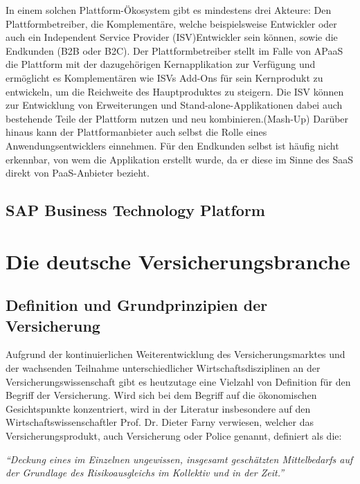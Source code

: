In einem solchen Plattform-Ökosystem gibt es mindestens drei Akteure: Den Plattformbetreiber, die Komplementäre, welche beispielsweise Entwickler oder auch ein Independent Service Provider (ISV)Entwickler sein können, sowie die Endkunden (B2B oder B2C). Der Plattformbetreiber stellt im Falle von APaaS die Plattform mit der dazugehörigen Kernapplikation zur Verfügung und ermöglicht es Komplementären wie ISVs Add-Ons für sein Kernprodukt zu entwickeln, um die Reichweite des Hauptproduktes zu steigern. Die ISV können zur Entwicklung von Erweiterungen und Stand-alone-Applikationen dabei auch bestehende Teile der Plattform nutzen und neu kombinieren.(Mash-Up) Darüber hinaus kann der Plattformanbieter auch selbst die Rolle eines Anwendungsentwicklers einnehmen.\autocite[Vgl.][S. 444f]{FOERDERER2018} Für den Endkunden selbst ist häufig nicht erkennbar, von wem die Applikation erstellt wurde, da er diese im Sinne des SaaS direkt von PaaS-Anbieter bezieht. \autocite[Vgl.][S. 372]{BEIMBORN2011}

\subsection{SAP Business Technology Platform}



\section{Die deutsche Versicherungsbranche}

\subsection{Definition und Grundprinzipien der Versicherung}

Aufgrund der kontinuierlichen Weiterentwicklung des Versicherungsmarktes und der wachsenden Teilnahme unterschiedlicher Wirtschaftsdisziplinen an der Versicherungswissenschaft gibt es heutzutage eine Vielzahl von Definition für den Begriff der Versicherung. Wird sich bei dem Begriff auf die ökonomischen Gesichtspunkte konzentriert, wird in der Literatur insbesondere auf den Wirtschaftswissenschaftler Prof. Dr. Dieter Farny verwiesen, welcher das Versicherungsprodukt, auch Versicherung oder Police genannt, definiert als die: 

\begin{center}
    \textit{\enquote{Deckung eines im Einzelnen ungewissen, insgesamt geschätzten Mittelbedarfs auf der Grundlage des Risikoausgleichs im Kollektiv und in der Zeit.}} \autocite[S. 8f.]{FARNY2011}
\end{center}


